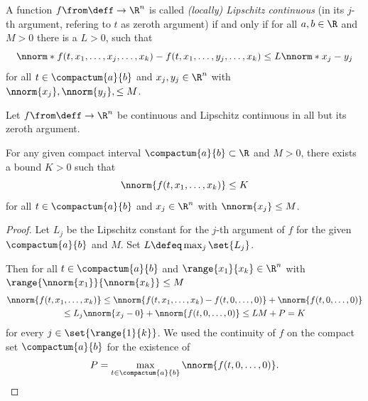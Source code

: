     \begin{definition}\label{def:lipschitz}
        A function $f\from\deff\to\R^n$ is called \emph{(locally) Lipschitz continuous} (in its $j$-th argument, refering to $t$ as zeroth argument) if and only if for all $a,b\in\R$ and $M>0$ there is a $L>0$, such that
        \begin{equation*}
            \nnorm*{f(t,x_1,\ldots,x_j,\ldots,x_k) - f(t,x_1,\ldots,y_j,\ldots,x_k)} \leq L\nnorm*{x_j-y_j}
        \end{equation*}
        for all $t\in\compactum{a}{b}$ and $x_j,y_j\in\R^n$ with $\nnorm{x_j},\nnorm{y_j},\leq M$.
    \end{definition}

    \begin{lemma}\label{lm:bounded-lipschitz}
        Let $f\from\deff\to\R^n$ be continuous and Lipschitz continuous in all but its zeroth argument.

        For any given compact interval $\compactum{a}{b}\subset\R$ and $M>0$, there exists a bound $K>0$ such that
        \begin{equation}
            \nnorm{f(t,x_1,\ldots,x_k)}\leq K
        \end{equation}
        for all $t\in\compactum{a}{b}$ and $x_j\in\R^n$ with $\nnorm{x_j}\leq M$.
    \end{lemma}
    \begin{proof}
        Let $L_j$ be the Lipschitz constant for the $j$-th argument of $f$ for the given $\compactum{a}{b}$ and $M$. Set $L\defeq\max_j\set{L_j}$.

        Then for all $t\in\compactum{a}{b}$ and $\range{x_1}{x_k}\in\R^n$ with $\range{\nnorm{x_1}}{\nnorm{x_k}}\leq M$
        \begin{multline*}
            \nnorm{f(t,x_1,\ldots,x_k)} \leq \nnorm{f(t,x_1,\ldots,x_k) - f(t,0,\ldots,0)} + \nnorm{f(t,0,\ldots,0)}\\
            \leq L_j\nnorm{x_j-0} + \nnorm{f(t,0,\ldots,0)} \leq LM+P = K
        \end{multline*}
        for every $j\in\set{\range{1}{k}}$. We used the continuity of $f$ on the compact set $\compactum{a}{b}$ for the existence of
        \begin{equation*}
            P = \max_{t\in\compactum{a}{b}}\nnorm{f(t,0,\ldots,0)}.
        \end{equation*}
    \end{proof}

